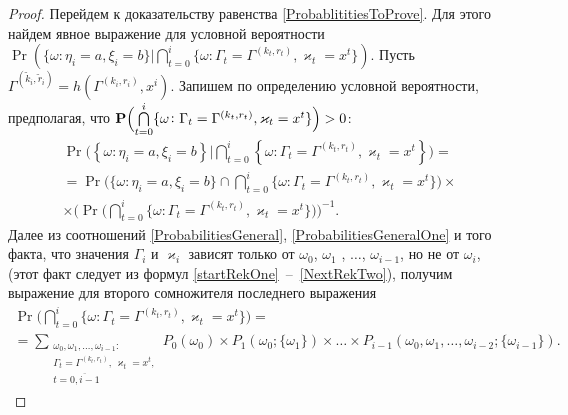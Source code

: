 \documentclass{report}
\begin{document}
\begin{proof}
Перейдем к доказательству равенства \eqref{ProbablititiesToProve}. Для этого найдем явное выражение для условной вероятности $\Pr (\{ \omega \colon \eta_i = a, \xi_i=b\} | \bigcap_{t=0}^{i}\{\omega\colon \Gamma_t=\Gamma^{(k_t,r_t)}, \varkappa_t=x^t\})$. Пусть $\Gamma^{(\tilde{k}_i,\tilde{r}_i)}=h(\Gamma^{(k_i,r_i)},x^i)$. Запишем по определению условной вероятности, предполагая, что $\Pr\Bigl(\bigcap\limits_{t=0}^{i}\{\omega\colon \Gamma_t=\Gamma^{(k_t,r_t)}, \varkappa_t=x^t\}\Bigr)>0$:
\begin{multline}
\Pr \biggl(\left\{ \omega \colon \eta_i = a, \xi_i=b\right\}  \bigg| \bigcap_{t=0}^{i}\left\{\omega\colon \Gamma_t=\Gamma^{(k_t,r_t)}, \varkappa_t=x^t\right\}\biggr) = \\
=\Pr\biggl(\{ \omega \colon \eta_i = a, \xi_i=b \} \cap \bigcap_{t=0}^{i}\{\omega\colon \Gamma_t=\Gamma^{(k_t,r_t)}, \varkappa_t=x^t\}\biggr) \times \\
\times
\biggl(\Pr\biggl( \bigcap_{t=0}^{i}\{\omega\colon \Gamma_t=\Gamma^{(k_t,r_t)}, \varkappa_t=x^t\}\biggr)\biggr)^{-1}.
\label{Construction:1}
\end{multline}
Далее из соотношений \eqref{ProbabilitiesGeneral}, \eqref{ProbabilitiesGeneralOne} и того факта, что значения $\Gamma_i$ и $\varkappa_{i}$ зависят только от $\omega_0$, $\omega_1$ , $\ldots$, $\omega_{i-1}$, но не от $\omega_i$, (этот факт следует из формул \eqref{startRekOne}~--~\eqref{NextRekTwo}), получим выражение для второго сомножителя последнего выражения
\begin{multline}
\Pr\biggl( \bigcap_{t=0}^{i}\{\omega\colon \Gamma_t=\Gamma^{(k_t,r_t)}, \varkappa_t=x^t\}\biggr)=\\
=\sum_{\substack{\omega_0, \omega_1,\ldots, \omega_{i-1} \colon \\ \Gamma_t=\Gamma^{(k_t,r_t)},\, \varkappa_t=x^t,\\ t=\overline{0,i-1}}} P_0(\omega_0)\times P_1(\omega_0;\{\omega_1\})\times\ldots\times P_{i-1}(\omega_0,\omega_1,\ldots, \omega_{i-2};\{\omega_{i-1}\}).
\label{Construction:2}
\end{multline}


\end{proof}
\end{document}
